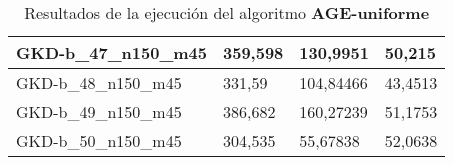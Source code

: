 \begin{table}[!ht]
\begin{adjustbox}{height=12cm}
\begin{tabular}{|l|l|l|l|}
		GKD-b\_47\_n150\_m45 & 359,598 & 130,9951  & 50,215    \\ \hline
		GKD-b\_48\_n150\_m45 & 331,59  & 104,84466 & 43,4513   \\ \hline
		GKD-b\_49\_n150\_m45 & 386,682 & 160,27239 & 51,1753   \\ \hline
		GKD-b\_50\_n150\_m45 & 304,535 & 55,67838  & 52,0638   \\ \hline
    \end{tabular}
    \end{adjustbox}
    \caption{Resultados de la ejecución del algoritmo \textbf{AGE-uniforme}}
\end{table}

\pagebreak